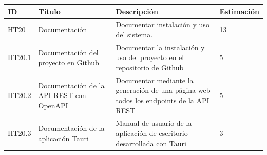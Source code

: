 \begin{table}[H]
    \begin{center}
        \begin{tabularx}{\textwidth}{|l|X|>{\raggedright\arraybackslash}X|l|}
            \hline
            ID & Título & Descripción & Estimación \\
            \hline
            HT20 & Documentación & Documentar instalación y uso del sistema. & 13 \\
            \hline
            HT20.1 & Documentación del proyecto en Github & Documentar la instalación y uso del proyecto en el repositorio de Github & 5 \\
            \hline
            HT20.2 &  Documentación de la API REST con OpenAPI & Documentar mediante la generación de una página web todos los endpoints de la API REST & 5 \\
            \hline
            HT20.3 & Documentación de la aplicación Tauri & Manual de usuario de la aplicación de escritorio desarrollada con Tauri & 3 \\
            \hline
        \end{tabularx}
    \end{center}
\end{table}

\newpage

